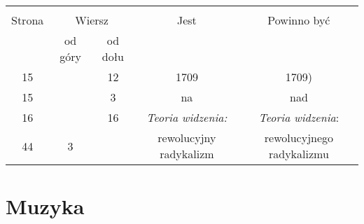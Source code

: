 \documentclass[a4paper,11pt]{article}
\begin{document}


\begin{center}

  \begin{tabular}{|c|c|c|c|c|}
    \hline
    & \multicolumn{2}{c|}{} & & \\
    Strona & \multicolumn{2}{c|}{Wiersz} & Jest
                              & Powinno być \\ \cline{2-3}
    & od góry & od dołu & & \\
    \hline
    15  & & 12 & 1709 & 1709) \\
    15  & &  3 & na & nad \\
    16  & & 16 & \textit{Teoria widzenia:} & \textit{Teoria widzenia}: \\
    44  &  3 & & rewolucyjny radykalizm & rewolucyjnego radykalizmu \\
    \hline
  \end{tabular}

\end{center}

\vspace{\spaceTwo}










\newpage
\section{Muzyka}

\vspace{\spaceTwo}








\end{document}
